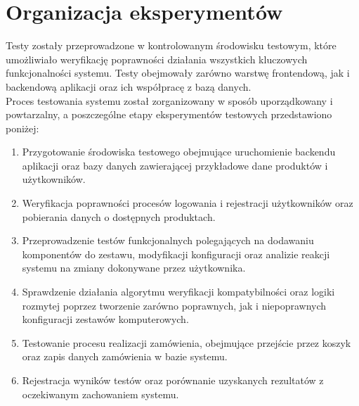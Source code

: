 \documentclass[a4paper,twoside,12pt]{book}
\begin{document}
\section{Organizacja eksperymentów}
Testy zostały przeprowadzone w kontrolowanym środowisku testowym,
które umożliwiało weryfikację poprawności działania wszystkich kluczowych
funkcjonalności systemu. Testy obejmowały zarówno warstwę frontendową, jak i
backendową aplikacji oraz ich współpracę z bazą danych.
\vspace{0.5cm}
\\
Proces testowania systemu został zorganizowany w sposób uporządkowany i
powtarzalny, a poszczególne etapy eksperymentów testowych przedstawiono poniżej:

\begin{enumerate}
    \item Przygotowanie środowiska testowego obejmujące uruchomienie backendu
    aplikacji oraz bazy danych zawierającej przykładowe dane produktów i
    użytkowników.

    \item Weryfikacja poprawności procesów logowania i rejestracji użytkowników
    oraz pobierania danych o dostępnych produktach.

    \item Przeprowadzenie testów funkcjonalnych polegających na dodawaniu
    komponentów do zestawu, modyfikacji konfiguracji oraz analizie reakcji
    systemu na zmiany dokonywane przez użytkownika.

    \item Sprawdzenie działania algorytmu weryfikacji kompatybilności oraz logiki
    rozmytej poprzez tworzenie zarówno poprawnych, jak i niepoprawnych
    konfiguracji zestawów komputerowych.

    \item Testowanie procesu realizacji zamówienia, obejmujące przejście przez
    koszyk oraz zapis danych zamówienia w bazie systemu.

    \item Rejestracja wyników testów oraz porównanie uzyskanych rezultatów z
    oczekiwanym zachowaniem systemu.
\end{enumerate}
\end{document}
